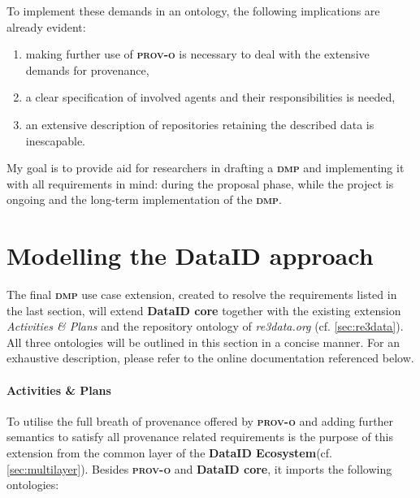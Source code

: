 \documentclass[a4paper,english,twoside,BCOR1.5cm,headsepline,DIV12,appendixprefix,final,12pt]{scrbook}
\newcommand{\ecosystem}{{\ttfamily\bfseries DataID Ecosystem}\xspace}
\newcommand{\core}{{\ttfamily\bfseries DataID core}\xspace}
\newcommand{\prov}{{\scshape\bfseries prov-o}\xspace}
\newcommand{\dmp}{{\scshape\bfseries dmp}\xspace}
\begin{document}
To implement these demands in an ontology, the following implications are already evident:
\begin{enumerate}
\item making further use of \prov is necessary to deal with the extensive demands for provenance,
\item a clear specification of involved agents and their responsibilities is needed, 
\item an extensive description of repositories retaining the described data is inescapable.
\end{enumerate}

My goal is to provide aid for researchers in drafting a \dmp and implementing it with all requirements in mind: during the proposal phase, while the project is ongoing and the long-term implementation of the \dmp.

\section{Modelling the DataID approach} 
\label{sec:dmpmodel}

The final \dmp use case extension, created to resolve the requirements listed in the last section, will extend \core together with the existing extension \textit{Activities \& Plans} and the repository ontology of \textit{re3data.org} (cf. \cref{sec:re3data}). All three ontologies will be outlined in this section in a concise manner. For an exhaustive description, please refer to the online documentation referenced below. 

\paragraph{Activities \& Plans} To utilise the full breath of provenance offered by \prov and adding further semantics to satisfy all provenance related requirements is the purpose of this extension from the common layer of the \ecosystem (cf. \cref{sec:multilayer}). 
Besides \prov and \core, it imports the following ontologies:
\end{document}

